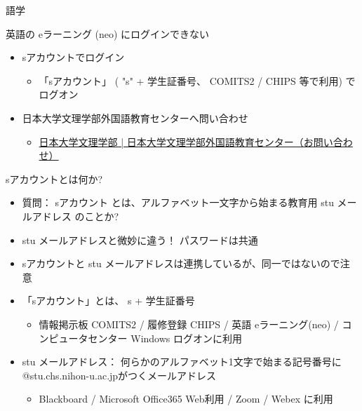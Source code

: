 \documentclass[a4j,10pt]{jsarticle}
\begin{document}
{\newpage\clearpage
{}%
\begin{frame}[label={sec:orgc09f1b5},fragile]{語学}
\begin{block}{英語の eラーニング (neo) にログインできない}
\begin{itemize}
\item sアカウントでログイン
\begin{itemize}
\item 「sアカウント」 ( "s" + 学生証番号、 COMITS2 / CHIPS 等で利用) でログオン
\end{itemize}
\par
\item 日本大学文理学部外国語教育センターへ問い合わせ
\begin{itemize}
\item \href{https://www.chs.nihon-u.ac.jp/contact/flec\_form/}{日本大学文理学部 | 日本大学文理学部外国語教育センター（お問い合わせ）}
\end{itemize}
\end{itemize}
\end{block}
\par
\begin{block}{sアカウントとは何か?}
\begin{itemize}
\item 質問： \alert{sアカウント} とは、アルファベット一文字から始まる教育用 \alert{stu メールアドレス} のことか?
\par
\item stu メールアドレスと微妙に違う！ パスワードは共通
\item sアカウントと stu メールアドレスは連携しているが、同一ではないので注意
\par
\item 「sアカウント」とは、 \alert{s} + \alert{学生証番号}
\begin{itemize}
\item 情報掲示板 COMITS2 / 履修登録 CHIPS / 英語 eラーニング(neo) / コンピュータセンター Windows ログオンに利用
\end{itemize}
\par
\item stu メールアドレス： 何らかのアルファベット1文字で始まる記号番号に@stu.chs.nihon-u.ac.jpがつくメールアドレス
\begin{itemize}
\item Blackboard / Microsoft Office365 Web利用 / Zoom / Webex に利用
\end{itemize}
\end{itemize}
\end{block}

\end{frame}}
\end{document}
